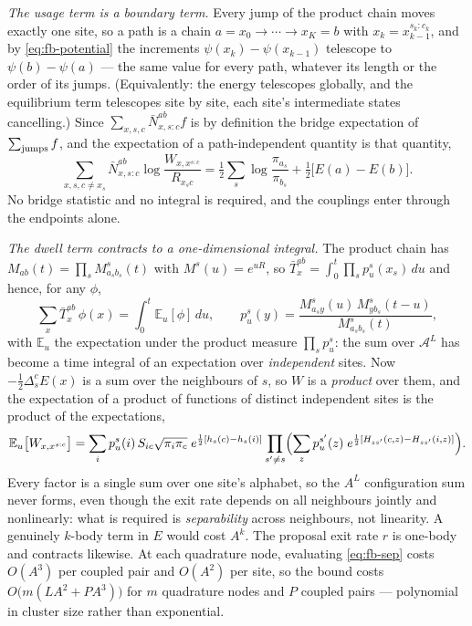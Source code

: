 \emph{The usage term is a boundary term.} Every jump of the product chain moves
exactly one site, so a path is a chain $a = x_0 \to \cdots \to x_K = b$ with
$x_k = x_{k-1}^{s_k : c_k}$, and by \eqref{eq:fb-potential} the increments
$\psi(x_k) - \psi(x_{k-1})$ telescope to $\psi(b) - \psi(a)$ --- the same value
for every path, whatever its length or the order of its jumps. (Equivalently:
the energy telescopes globally, and the equilibrium term telescopes site by
site, each site's intermediate states cancelling.) Since
$\sum_{x,s,c} \bar N^{ab}_{x,s:c} f$ is by definition the bridge expectation of
$\sum_{\rm jumps} f$, and the expectation of a path-independent quantity is that
quantity,
\begin{equation}
\label{eq:fb-telescope}
    \sum_{x, s, c \neq x_s} \bar N^{ab}_{x, s:c}
        \log \frac{W_{x, x^{s:c}}}{R_{x_s c}}
    = \tfrac12 \sum_s \log \frac{\pi_{a_s}}{\pi_{b_s}}
      + \tfrac12 \bigl[E(a) - E(b)\bigr].
\end{equation}
No bridge statistic and no integral is required, and the couplings enter through
the endpoints alone.

\emph{The dwell term contracts to a one-dimensional integral.} The product chain
has $M_{ab}(t) = \prod_s M^s_{a_s b_s}(t)$ with $M^s(u) = e^{uR}$, so
$\bar T^{ab}_x = \int_0^t \prod_s p^s_u(x_s)\, du$ and hence, for any $\phi$,
\begin{equation}
\label{eq:fb-contract}
    \sum_x \bar T^{ab}_x\, \phi(x) = \int_0^t \mathbb{E}_u[\phi]\, du,
    \qquad
    p^s_u(y) = \frac{M^s_{a_s y}(u)\, M^s_{y b_s}(t-u)}{M^s_{a_s b_s}(t)},
\end{equation}
with $\mathbb{E}_u$ the expectation under the product measure $\prod_s p^s_u$:
the sum over $\mathcal{A}^L$ has become a time integral of an expectation over
\emph{independent} sites. Now $-\tfrac12 \Delta^c_s E(x)$ is a sum over the
neighbours of $s$, so $W$ is a \emph{product} over them, and the expectation of
a product of functions of distinct independent sites is the product of the
expectations,
\begin{equation}
\label{eq:fb-sep}
    \mathbb{E}_u\bigl[W_{x, x^{s:c}}\bigr]
    = \sum_i p^s_u(i)\, S_{ic} \sqrt{\pi_i \pi_c}\;
        e^{\frac12 [h_s(c) - h_s(i)]}
        \prod_{s' \neq s} \Bigl(
            \sum_z p^{s'}_u(z)\; e^{\frac12 [H_{ss'}(c,z) - H_{ss'}(i,z)]}
        \Bigr).
\end{equation}
Every factor is a single sum over one site's alphabet, so the $A^L$
configuration sum never forms, even though the exit rate depends on all
neighbours jointly and nonlinearly: what is required is \emph{separability}
across neighbours, not linearity. A genuinely $k$-body term in $E$ would cost
$A^k$. The proposal exit rate $r$ is one-body and contracts likewise. At each
quadrature node, evaluating \eqref{eq:fb-sep} costs $O(A^3)$ per coupled pair
and $O(A^2)$ per site, so the bound costs $O\bigl(m(L A^2 + P A^3)\bigr)$ for
$m$ quadrature nodes and $P$ coupled pairs --- polynomial in cluster size rather
than exponential.

